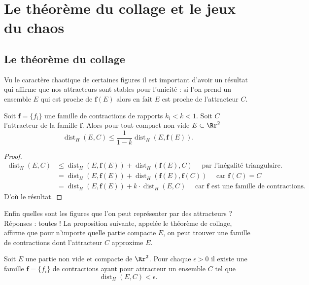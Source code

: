 \documentclass[11pt,class=report,crop=false]{standalone}
\DeclareMathOperator{\dist}{dist}
\begin{document}
\section{Le théorème du collage et le jeux du chaos}

\subsection{Le théorème du collage}


Vu le caractère \og chaotique \fg{} de certaines figures il est important d'avoir
un résultat qui affirme que nos attracteurs sont stables pour l'unicité : si l'on prend 
un ensemble $E$ qui est proche de $\mathbf{f}(E)$
alors en fait $E$ est proche de l'attracteur $C$. 


\begin{proposition}
\label{prop:stable}
Soit $\mathbf{f}=\{f_i\}$ une famille de contractions de rapports $k_i < k <1$.
Soit $C$ l'attracteur de la famille $\mathbf{f}$.
Alors pour tout compact non vide $E \subset \Rr^2$
$$\dist_H(E,C) \le \frac{1}{1-k} \dist_H (E,\mathbf{f}(E)).$$
\end{proposition}

\begin{proof}
\begin{align*}
\dist_H(E,C) 
   &\le \dist_H(E,\mathbf{f}(E))+ \dist_H(\mathbf{f}(E),C)\quad \text{ par l'inégalité triangulaire.} \\
   &= \dist_H(E,\mathbf{f}(E))+  \dist_H(\mathbf{f}(E),\mathbf{f}(C)) \quad \text{ car } \mathbf{f}(C) = C\\  
   &= \dist_H(E,\mathbf{f}(E))+  k \cdot \dist_H(E,C) \quad \text{ car $\mathbf{f}$ est une famille de contractions.}         
\end{align*}
D'où le résultat.               
\end{proof}


Enfin quelles sont les figures que l'on peut représenter par des attracteurs ?
Réponses : toutes ! La proposition suivante, appelée le théorème de collage,
affirme que pour n'importe quelle partie compacte $E$, on peut trouver
une famille de contractions dont l'attracteur $C$ approxime $E$.
\begin{theoreme}[du collage]
Soit $E$ une partie non vide et compacte de $\Rr^2$.
Pour chaque $\epsilon >0$ il existe une famille $\mathbf{f}=\{f_i\}$ de contractions 
ayant pour attracteur un ensemble $C$ tel que 
$$\dist_H(E,C) < \epsilon.$$
\end{theoreme}
\end{document}
